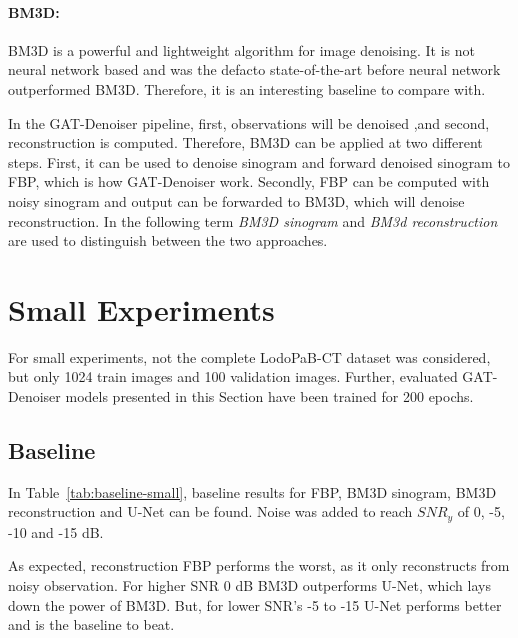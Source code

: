 \paragraph{BM3D:}
BM3D is a powerful and lightweight algorithm for image denoising. 
It is not neural network based and was the defacto state-of-the-art before neural network outperformed
BM3D. Therefore, it is an interesting baseline to compare with.

In the GAT-Denoiser pipeline, first, observations will be denoised ,and second, reconstruction is computed.
Therefore, BM3D can be applied at two different steps. First, it can be used to denoise sinogram
and forward denoised sinogram to FBP, which is how GAT-Denoiser work. Secondly, FBP can be
computed with noisy sinogram and output can be forwarded to BM3D, which will denoise reconstruction.
In the following term \textit{BM3D sinogram} and \textit{BM3d reconstruction} 
are used to distinguish between the two approaches.

\section{Small Experiments}
For small experiments, not the complete LodoPaB-CT dataset was considered, but only 1024 train images
and 100 validation images. 
Further, evaluated GAT-Denoiser models presented in this Section have been trained for 200 epochs.

\subsection{Baseline}

In Table~\ref{tab:baseline-small}, baseline results for FBP, BM3D sinogram, BM3D reconstruction and U-Net can be found.
Noise was added to reach $\textit{SNR}_y$ of 0, -5, -10 and -15 dB.

As expected, reconstruction FBP performs the worst, as it only reconstructs from noisy observation. 
For higher SNR 0 dB BM3D outperforms U-Net, which lays down the power of BM3D.
But, for lower SNR's -5 to -15 U-Net performs better and is the baseline to beat.

